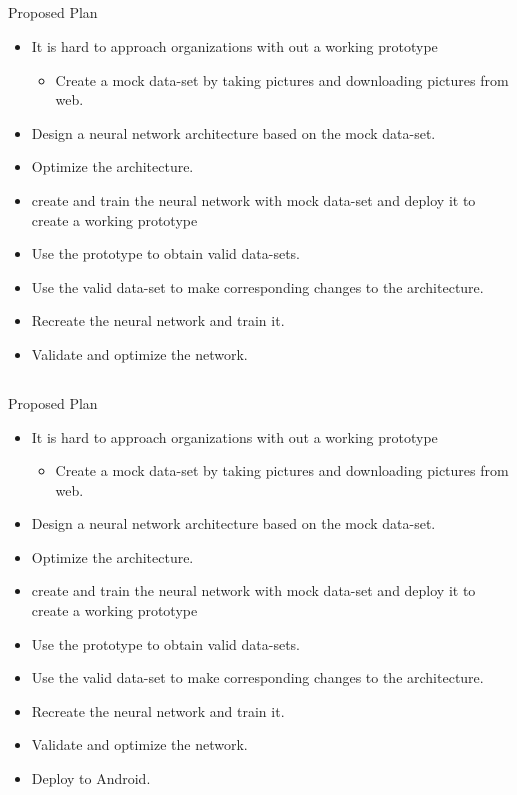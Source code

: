 \documentclass{beamer}
\begin{document}
\subsection*{}
\begin{frame}{Proposed Plan}
\begin{itemize}
\item{
It is hard to approach organizations with out a working prototype
\begin{itemize}
\item{
Create a mock data-set by taking pictures and downloading pictures from web.
}
\end{itemize}
}
\item{
Design a neural network architecture based on the mock data-set.
}
\item{
Optimize the architecture.
}
\item{
create and train the neural network with mock data-set and deploy it to create a working prototype
}
\item{
Use the prototype to obtain valid data-sets.
}
\item{
Use the valid data-set to make corresponding changes to the architecture.
}
\item{
Recreate the neural network and train it.
}
\item{
Validate and optimize the network.
}
\end{itemize}
\end{frame}
\subsection*{}
\begin{frame}{Proposed Plan}
\begin{itemize}
\item{
It is hard to approach organizations with out a working prototype
\begin{itemize}
\item{
Create a mock data-set by taking pictures and downloading pictures from web.
}
\end{itemize}
}
\item{
Design a neural network architecture based on the mock data-set.
}
\item{
Optimize the architecture.
}
\item{
create and train the neural network with mock data-set and deploy it to create a working prototype
}
\item{
Use the prototype to obtain valid data-sets.
}
\item{
Use the valid data-set to make corresponding changes to the architecture.
}
\item{
Recreate the neural network and train it.
}
\item{
Validate and optimize the network.
}
\item{
Deploy to Android.
}
\end{itemize}
\end{frame}
\end{document}
